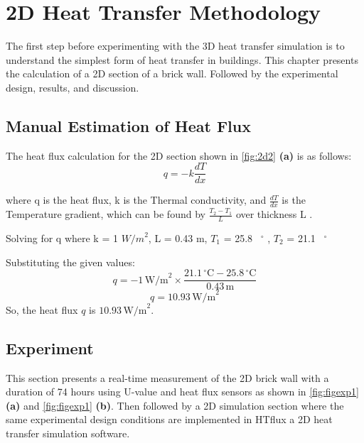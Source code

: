 \chapter{2D Heat Transfer Methodology}
The first step before experimenting with the 3D heat transfer simulation is to understand the simplest form of heat transfer in buildings. This chapter presents the calculation of a 2D section of a brick wall. Followed by the experimental design, results, and discussion.

\section{Manual Estimation of Heat Flux}
The heat flux calculation for the 2D section shown in \ref{fig:2d2} \textbf{(a)} is as follows:
\begin{equation}
q = -k \frac{dT}{dx}
\end{equation}

where q is the heat flux,
k is the Thermal conductivity, and
$\frac{dT}{dx}$ is the Temperature gradient, which can be found by $\frac{T_2 - T_1}{L}$ over thickness L \cite{heattransfund}. 

Solving for q where k = 1 ${W/m}^2$, 
L = 0.43 m,
$T_1$ = 25.8 \, $^\circ$ , 
$T_2$  = 21.1 \, $^\circ$ 



Substituting the given values:
\[ q = -1 \, \text{W/m}^2 \times \frac{21.1 \, ^\circ \text{C} - 25.8 \, ^\circ \text{C}}{0.43 \, \text{m}} \]
\[ q = 10.93 \, \text{W/m}^2 \]
So, the heat flux \( q \) is \( 10.93 \, \text{W/m}^2 \).








\section{Experiment}
This section presents a real-time measurement of the 2D brick wall with a duration of 74 hours using U-value and heat flux sensors as shown in \ref{fig:figexp1} \textbf{(a)} and \ref{fig:figexp1} \textbf{(b)}. Then followed by a 2D simulation section where the same experimental design conditions are implemented in HTflux \cite{HTflux} a 2D heat transfer simulation software.

